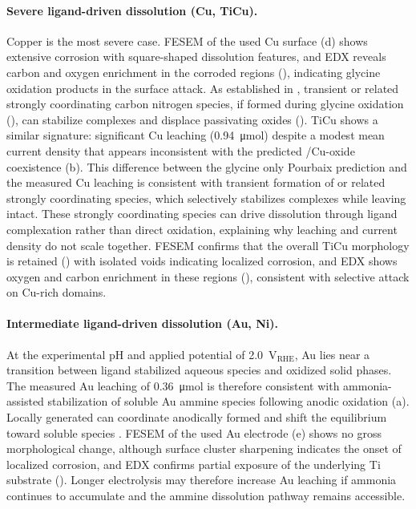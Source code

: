 \documentclass[twoside,twocolumn,9pt]{article}
\begin{document}
\paragraph{Severe ligand-driven dissolution (Cu, TiCu).}
Copper is the most severe case. FESEM of the used Cu surface (d) shows extensive corrosion with square-shaped dissolution features, and EDX reveals carbon and oxygen enrichment in the corroded regions (), indicating glycine oxidation products in the surface attack. As established in , transient  or related strongly coordinating carbon nitrogen species, if formed during glycine oxidation (), can stabilize  complexes and displace passivating oxides (). TiCu shows a similar signature: significant Cu leaching (0.94~\si{\micro mol}) despite a modest mean current density that appears inconsistent with the predicted /Cu-oxide coexistence (b). This difference between the glycine only Pourbaix prediction and the measured Cu leaching is consistent with transient formation of  or related strongly coordinating species, which selectively stabilizes  complexes while leaving  intact. These strongly coordinating species can drive dissolution through ligand complexation rather than direct oxidation, explaining why leaching and current density do not scale together. FESEM confirms that the overall TiCu morphology is retained () with isolated voids indicating localized corrosion, and EDX shows oxygen and carbon enrichment in these regions (), consistent with selective attack on Cu-rich domains.

\paragraph{Intermediate ligand-driven dissolution (Au, Ni).}
At the experimental pH and applied potential of 2.0~V$_{\mathrm{RHE}}$, Au lies near a transition between ligand stabilized aqueous species and oxidized solid phases. The measured Au leaching of 0.36~\si{\micro mol} is therefore consistent with ammonia-assisted stabilization of soluble Au ammine species following anodic oxidation (a). Locally generated  can coordinate anodically formed  and shift the equilibrium toward soluble  species \cite{Armunanto2004}. FESEM of the used Au electrode (e) shows no gross morphological change, although surface cluster sharpening indicates the onset of localized corrosion, and EDX confirms partial exposure of the underlying Ti substrate (). Longer electrolysis may therefore increase Au leaching if ammonia continues to accumulate and the ammine dissolution pathway remains accessible.
\end{document}
